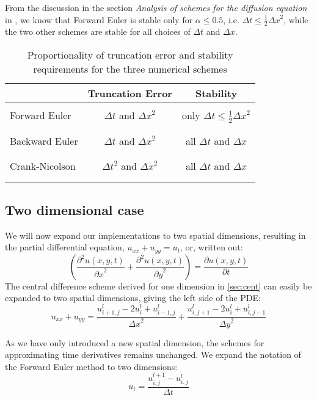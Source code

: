 \documentclass[10pt,a4paper]{article}
\newcommand{\half}{\frac{1}{2}}
\newcommand{\dt}{{\Delta t}}
\newcommand{\dx}{{\Delta x}}
\newcommand{\dy}{{\Delta y}}
\newcommand{\pt}{{\partial t}}
\newcommand{\px}{{\partial x}}
\newcommand{\py}{{\partial y}}
\newcommand{\pu}{{\partial u}}
\newcommand{\ppu}{{\partial^2 u}}
\begin{document}
From the discussion in the section \textit{Analysis of schemes for the diffusion equation} in \cite{hpl_fdm}, we know that Forward Euler is stable only for $\alpha \leq 0.5$, i.e. $\dt \leq \half \dx^2$, while the two other schemes are stable for all choices of $\dt$ and $\dx$.



\begin{table}[H]
\begin{center}
\begin{tabular}{lcc}
 		& Truncation Error	& Stability
\\ \hline \\
Forward Euler	& $\dt$ and $\dx^2$	& only $\dt \le \frac{1}{2}\dx^2$ \\
\\ \hline \\
Backward Euler	& $\dt$ and $\dx^2$	& all $\dt$ and $\dx$ \\
\\ \hline \\
Crank-Nicolson	& $\dt^2$ and $\dx^2$	& all $\dt$ and $\dx$ \\
\\ \hline \\
\end{tabular}
\end{center}
\caption{Proportionality of truncation error and stability requirements for the three numerical schemes}
\label{table:error}
\end{table}


\subsection{Two dimensional case}
We will now expand our implementations to two spatial dimensions, resulting in the partial differential equation, $u_{xx} + u_{yy} = u_t$, or, written out:
\begin{equation}
\left(\frac{\ppu(x,y,t)}{\px^2} + \frac{\ppu(x,y,t)}{\py^2}\right) = \frac{\pu(x,y,t)}{\pt}
\label{eq:diffusion_2d}
\end{equation}
The central difference scheme derived for one dimension in \ref{sec:cent} can easily be expanded to two spatial dimensions, giving the left side of the PDE:
\begin{equation}
u_{xx} + u_{yy} = \frac{u_{i+1,j}^l - 2u_i^l+u_{i-1,j}^l}{\dx^2} + \frac{u_{i,j+1}^l - 2u_i^l+u_{i,j-1}^l}{\dy^2}
\end{equation}

As we have only introduced a new spatial dimension, the schemes for approximating time derivatives remains unchanged. We expand the notation of the Forward Euler method to two dimensions:
\begin{equation}
u_t = \frac{u_{i,j}^{l+1} - u_{i,j}^l}{\dt}
\end{equation}
\end{document}
